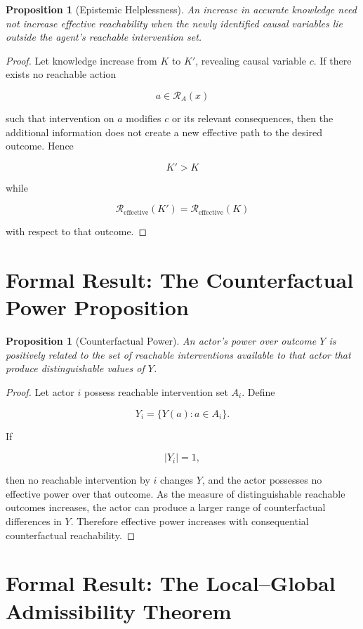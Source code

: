 \documentclass[11pt,oneside]{book}
\newtheorem{proposition}[theorem]{Proposition}
\theoremstyle{definition}
\theoremstyle{remark}
\newcommand{\R}{\mathcal{R}}
\begin{document}
\begin{proposition}[Epistemic Helplessness]
An increase in accurate knowledge need not increase effective reachability when the newly identified causal variables lie outside the agent's reachable intervention set.
\end{proposition}

\begin{proof}
Let knowledge increase from \(K\) to \(K'\), revealing causal variable \(c\). If there exists no reachable action

\[
a\in\R_A(x)
\]

such that intervention on \(a\) modifies \(c\) or its relevant consequences, then the additional information does not create a new effective path to the desired outcome. Hence

\[
K'>K
\]

while

\[
\R_{\mathrm{effective}}(K')
=
\R_{\mathrm{effective}}(K)
\]

with respect to that outcome.
\end{proof}

\section{Formal Result: The Counterfactual Power Proposition}

\begin{proposition}[Counterfactual Power]
An actor's power over outcome \(Y\) is positively related to the set of reachable interventions available to that actor that produce distinguishable values of \(Y\).
\end{proposition}

\begin{proof}
Let actor \(i\) possess reachable intervention set \(A_i\). Define

\[
Y_i
=
\{Y(a):a\in A_i\}.
\]

If

\[
|Y_i|=1,
\]

then no reachable intervention by \(i\) changes \(Y\), and the actor possesses no effective power over that outcome. As the measure of distinguishable reachable outcomes increases, the actor can produce a larger range of counterfactual differences in \(Y\). Therefore effective power increases with consequential counterfactual reachability.
\end{proof}

\section{Formal Result: The Local--Global Admissibility Theorem}
\end{document}
